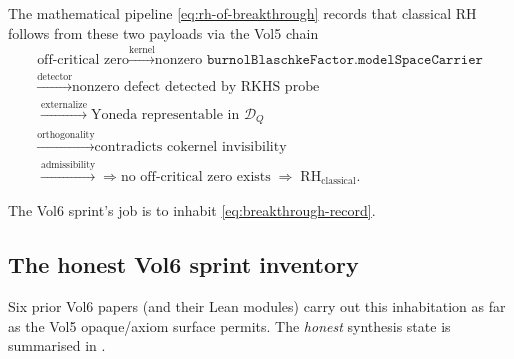 \documentclass[11pt]{article}
\theoremstyle{plain}
\theoremstyle{definition}
\theoremstyle{remark}
\newcommand{\DQ}{\mathcal{D}_{Q}}
\newcommand{\code}[1]{\texttt{#1}}
\newcommand{\RH}{\mathrm{RH}_{\mathrm{classical}}}
\begin{document}
The mathematical pipeline \eqref{eq:rh-of-breakthrough} records that
classical RH follows from these two payloads via the Vol5 chain
\[
  \begin{array}{l}
    \text{off-critical zero}
      \xrightarrow{\text{kernel}} \text{nonzero }
        \code{burnolBlaschkeFactor.modelSpaceCarrier} \\
    \xrightarrow{\text{detector}} \text{nonzero defect detected
      by RKHS probe}\\
    \xrightarrow{\text{externalize}} \text{Yoneda representable in
      }\DQ\\
    \xrightarrow{\text{orthogonality}} \text{contradicts cokernel
      invisibility}\\
    \xrightarrow{\text{admissibility}}\Longrightarrow \text{no
      off-critical zero exists}
    \;\Longrightarrow\;\RH.
  \end{array}
\]

The Vol6 sprint's job is to inhabit \eqref{eq:breakthrough-record}.

\subsection{The honest Vol6 sprint inventory}
\label{sec:honest-inventory}

Six prior Vol6 papers (and their Lean modules) carry out this
inhabitation as far as the Vol5 opaque/axiom surface permits. The
\emph{honest} synthesis state is summarised in
.
\end{document}
